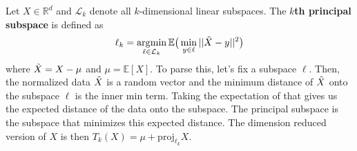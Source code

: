     \begin{definition}
      Let $X \in \mathbb{R}^d$ and $\mathcal{L}_k$ denote all $k$-dimensional linear subspaces. The \textbf{$k$th principal subspace} is defined as 
      \begin{equation}
        \ell_k = \operatorname*{\arg\!\min}_{\ell \in \mathcal{L}_k} \mathbb{E} \big( \min_{y \in \ell} ||\Tilde{X} - y||^2 \big)
      \end{equation}
      where $\Tilde{X} = X - \mu$ and $\mu = \mathbb{E}[X]$. To parse this, let's fix a subspace $\ell$. Then, the normalized data $\Tilde{X}$ is a random vector and the minimum distance of $\Tilde{X}$ onto the subspace $\ell$ is the inner min term. Taking the expectation of that gives us the expected distance of the data onto the subspace. The principal subspace is the subspace that minimizes this expected distance. The dimension reduced version of $X$ is then $T_k (X) = \mu + \mathrm{proj}_{\ell_k} X$. 

      \begin{figure}[H]
        \centering
        \begin{subfigure}[b]{0.4\textwidth}
        \centering
\end{subfigure}
\end{figure}
\end{definition}
